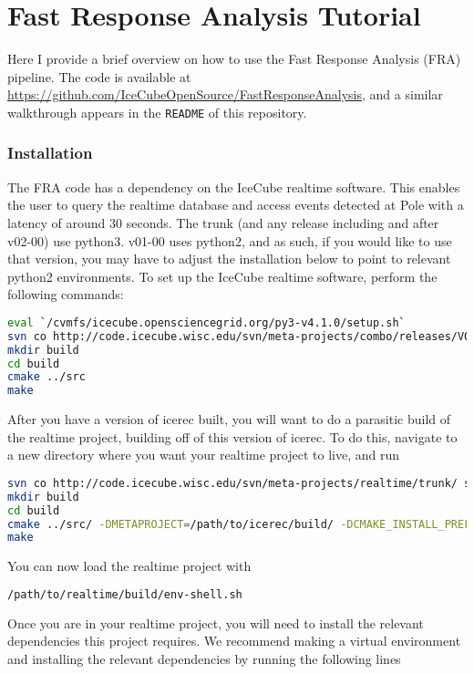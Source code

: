 \chapter{Fast Response Analysis Tutorial}
\label{sec:FRA_tutorial}

Here I provide a brief overview on how to use the Fast Response Analysis (FRA) pipeline. The code is available at \url{https://github.com/IceCubeOpenSource/FastResponseAnalysis}, and a similar walkthrough appears in the \texttt{README} of this repository. 

\subsection{Installation}
The FRA code has a dependency on the IceCube realtime software. This enables the user to query the realtime database and access events detected at Pole with a latency of around 30 seconds. The trunk (and any release including and after v02-00) use python3. v01-00 uses python2, and as such, if you would like to use that version, you may have to adjust the installation below to point to relevant python2 environments. To set up the IceCube realtime software, perform the following commands:

\begin{lstlisting}[language=bash]
eval `/cvmfs/icecube.opensciencegrid.org/py3-v4.1.0/setup.sh`
svn co http://code.icecube.wisc.edu/svn/meta-projects/combo/releases/V01-00-00/ src
mkdir build 
cd build
cmake ../src
make
\end{lstlisting}

After you have a version of icerec built, you will want to do a parasitic build of the realtime project, building off of this version of icerec. To do this, navigate to a new directory where you want your realtime project to live, and run

\begin{lstlisting}[language=bash]
svn co http://code.icecube.wisc.edu/svn/meta-projects/realtime/trunk/ src
mkdir build 
cd build
cmake ../src/ -DMETAPROJECT=/path/to/icerec/build/ -DCMAKE_INSTALL_PREFIX=combo-plus.${OS_ARCH}
make
\end{lstlisting}

You can now load the realtime project with

\begin{lstlisting}[language=bash]
/path/to/realtime/build/env-shell.sh
\end{lstlisting}

Once you are in your realtime project, you will need to install the relevant dependencies this project requires. We recommend making a virtual environment and installing the relevant dependencies by running the following lines

